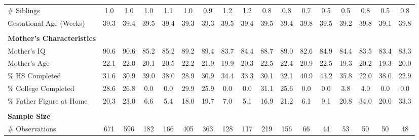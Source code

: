 \begin{tabular}{lcccccccccccccccc}
\quad \# Siblings & 1.0 & 1.0 & 1.0 & 1.1 & 1.0 & 0.9 & 1.2 & 1.2 & 0.8 & 0.8 & 0.7 & 0.5 & 0.5 & 0.8 & 0.5 & 0.8 \\
\quad Gestational Age (Weeks) & 39.3 & 39.4 & 39.5 & 39.4 & 39.3 & 39.3 & 39.5 & 39.4 & 39.5 & 39.4 & 39.8 & 39.5 & 39.2 & 39.8 & 39.1 & 39.8 \\
 \\
\textbf{Mother's Characteristics} \\
\quad Mother's IQ & 90.6 & 90.6 & 85.2 & 85.2 & 89.2 & 89.4 & 83.7 & 84.4 & 88.7 & 89.0 & 82.6 & 84.9 & 84.4 & 83.5 & 83.4 & 83.3 \\
\quad Mother's Age & 22.1 & 22.0 & 20.1 & 20.5 & 22.2 & 21.9 & 19.9 & 20.3 & 22.5 & 22.4 & 20.9 & 22.5 & 19.3 & 20.2 & 19.3 & 20.0 \\
\quad \% HS Completed & 31.6 & 30.9 & 39.0 & 38.0 & 28.9 & 30.9 & 34.4 & 33.3 & 30.1 & 32.1 & 40.9 & 43.2 & 35.8 & 22.0 & 38.0 & 22.9 \\
\quad \% College Completed & 28.6 & 26.8 & 0.0 & 0.0 & 29.9 & 25.9 & 0.0 & 0.0 & 31.1 & 25.6 & 0.0 & 0.0 & 3.8 & 4.0 & 0.0 & 0.0 \\
\quad \% Father Figure at Home & 20.3 & 23.0 & 6.6 & 5.4 & 18.0 & 19.7 & 7.0 & 5.1 & 16.9 & 21.2 & 6.1 & 9.1 & 20.8 & 34.0 & 20.0 & 33.3 \\
 \\
\textbf{Sample Size} \\
\quad \# Observations & 671 & 596 & 182 & 166 & 405 & 363 & 128 & 117 & 219 & 156 & 66 & 44 & 53 & 50 & 50 & 48 \\
\midrule 
\bottomrule 
\end{tabular}
